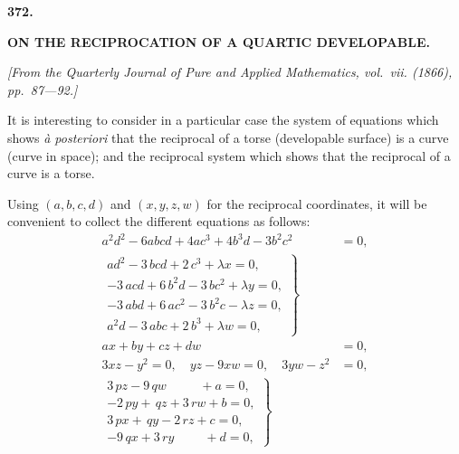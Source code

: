 \documentclass[11pt,a4paper]{article}
\begin{document}

\newpage
\begin{center}
\textbf{372.}
\end{center}
\vspace{-8pt}

\begin{center}
\textbf{ON THE RECIPROCATION OF A QUARTIC DEVELOPABLE.}
\end{center}

\begin{flushright}
\small\textit{[From the Quarterly Journal of Pure and Applied Mathematics, vol.~vii. (1866), pp.~87---92.]}
\end{flushright}

\vspace{6pt}

\noindent
It is interesting to consider in a particular case the system of equations which shows \textit{\`a posteriori} that the reciprocal of a torse (developable surface) is a curve (curve in space); and the reciprocal system which shows that the reciprocal of a curve is a torse.

Using $(a, b, c, d)$ and $(x, y, z, w)$ for the reciprocal coordinates, it will be convenient to collect the different equations as follows:
\begin{align}
a^{2}d^{2} - 6abcd + 4ac^{3} + 4b^{3}d - 3b^{2}c^{2} &= 0,\\
\left.\begin{array}{r}
ad^{2} - 3\,bcd + 2\,c^{3} + \lambda x = 0,\\
-3\,acd + 6\,b^{2}d - 3\,bc^{2} + \lambda y = 0,\\
-3\,abd + 6\,ac^{2} - 3\,b^{2}c - \lambda z = 0,\\
a^{2}d - 3\,abc + 2\,b^{3} + \lambda w = 0,
\end{array}\right\} \\
ax + by + cz + dw &= 0,\\
3xz - y^{2} = 0,\quad yz - 9xw = 0,\quad 3yw - z^{2} &= 0,\\
\left.\begin{array}{r}
3\,pz - 9\,qw \phantom{+ 3\,rw} + a = 0,\\
-2\,py + \,qz + 3\,rw + b = 0,\\
3\,px + \,qy - 2\,rz + c = 0,\\
-9\,qx + 3\,ry \phantom{+ 2\,rz} + d = 0,
\end{array}\right\}
\end{align}
\end{document}
